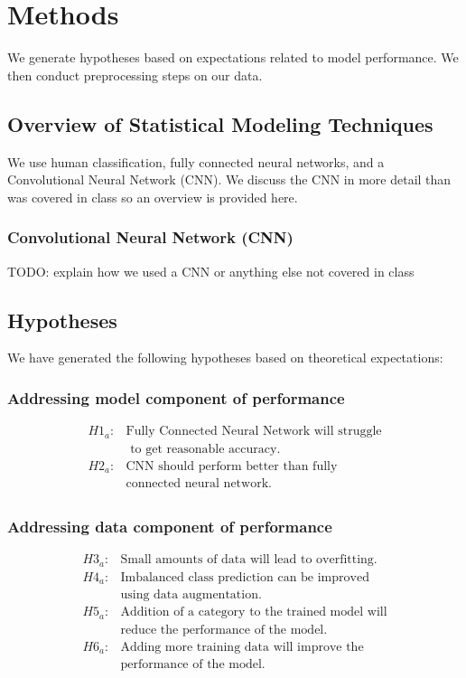 \documentclass[12pt]{article}
\begin{document}
\section{Methods}

We generate hypotheses based on expectations related to model performance. We
then conduct preprocessing steps on our data.

\subsection{Overview of Statistical Modeling Techniques}

We use human classification, fully connected neural networks,
and a Convolutional Neural Network (CNN). We discuss the CNN in
more detail than was covered in class so an overview is provided
here.

\subsubsection{Convolutional Neural Network (CNN)}

TODO: explain how we used a CNN or anything else not covered in class

\subsection{Hypotheses}

We have generated the following hypotheses based on theoretical
expectations:

\subsubsection{Addressing model component of performance}

\begin{align*}
  H1_a: &\text{Fully Connected Neural Network will struggle} \\
  &\text{ to get reasonable accuracy.} \\
  H2_a: &\text{CNN should perform better than fully} \\
  &\text{connected neural network.} \\
\end{align*}

\subsubsection{Addressing data component of performance}
\begin{align*}
  H3_a: &\text{Small amounts of data will lead to overfitting.} \\
  H4_a: &\text{Imbalanced class prediction can be improved}\\
  &\text{using data augmentation.} \\
  H5_a: &\text{Addition of a category to the trained model will} \\
  &\text{reduce the performance of the model.} \\
  H6_a: &\text{Adding more training data will improve the} \\
  &\text{performance of the model.} \\
\end{align*}
\end{document}
